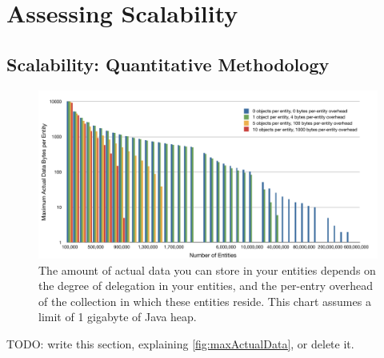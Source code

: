 \chapter{Assessing Scalability}

\section{Scalability: Quantitative Methodology}

\begin{figure}
\centering
	\includegraphics[width=\textwidth]{part3/Figures/extreme/maxActualData}
	\caption{The amount of actual data you can store in your entities depends on
	the degree of delegation in your entities, and the per-entry overhead of the collection in which these entities
	reside. This chart assumes a limit of 1 gigabyte of Java heap.}
	\label{fig:maxActualData}
\end{figure}

TODO: write this section, explaining \autoref{fig:maxActualData}, or delete it.
